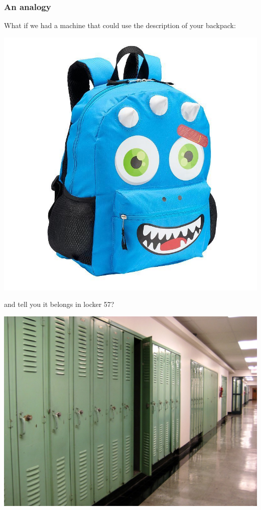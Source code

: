 \documentclass{beamer}
\begin{document}
\begin{frame}
    \frametitle{An analogy}
    What if we had a machine that could use the description of your backpack:

    \begin{center}
        \includegraphics[height=0.3\textheight]{backpack.jpg}
    \end{center}

    and tell you it belongs in locker 57?

    \begin{center}
        \includegraphics[width=0.3\textheight]{lockers.jpg}
    \end{center}
\end{frame}
\end{document}
